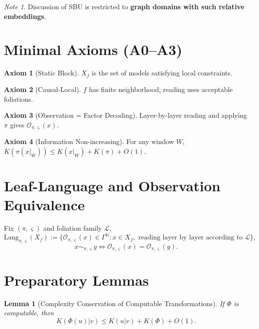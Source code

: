 \documentclass[11pt]{article}
\newtheorem{lemma}[theorem]{Lemma}
\theoremstyle{definition}
\newtheorem{axiom}{Axiom}
\theoremstyle{remark}
\newtheorem*{note}{Note}
\begin{document}
\begin{note}
Discussion of SBU is restricted to \textbf{graph domains with such relative embeddings}.
\end{note}

\section{Minimal Axioms (A0--A3)}

\begin{axiom}[Static Block]\label{ax:A0}
\( X_f \) is the set of models satisfying local constraints.
\end{axiom}

\begin{axiom}[Causal-Local]\label{ax:A1}
\( f \) has finite neighborhood; reading uses acceptable foliations.
\end{axiom}

\begin{axiom}[Observation = Factor Decoding]\label{ax:A2}
Layer-by-layer reading and applying \( \pi \) gives \( \mathcal{O}_{\pi, \varsigma}(x) \).
\end{axiom}

\begin{axiom}[Information Non-increasing]\label{ax:A3}
For any window \( W \), \( K(\pi(x|_W)) \leq K(x|_W) + K(\pi) + O(1) \).
\end{axiom}

\section{Leaf-Language and Observation Equivalence}

Fix \( (\pi, \varsigma) \) and foliation family \( \mathcal{L} \),
\[
\mathrm{Lang}_{\pi, \varsigma}(X_f) := \{\mathcal{O}_{\pi, \varsigma}(x) \in \Gamma^{\mathbb{N}} : x \in X_f, \text{ reading layer by layer according to } \mathcal{L}\},
\]
\[
x \sim_{\pi, \varsigma} y \iff \mathcal{O}_{\pi, \varsigma}(x) = \mathcal{O}_{\pi, \varsigma}(y).
\]

\section{Preparatory Lemmas}

\begin{lemma}[Complexity Conservation of Computable Transformations]\label{lem:5.1}
If \( \Phi \) is computable, then
\[
K(\Phi(u)|v) \leq K(u|v) + K(\Phi) + O(1).
\]
\end{lemma}
\end{document}
